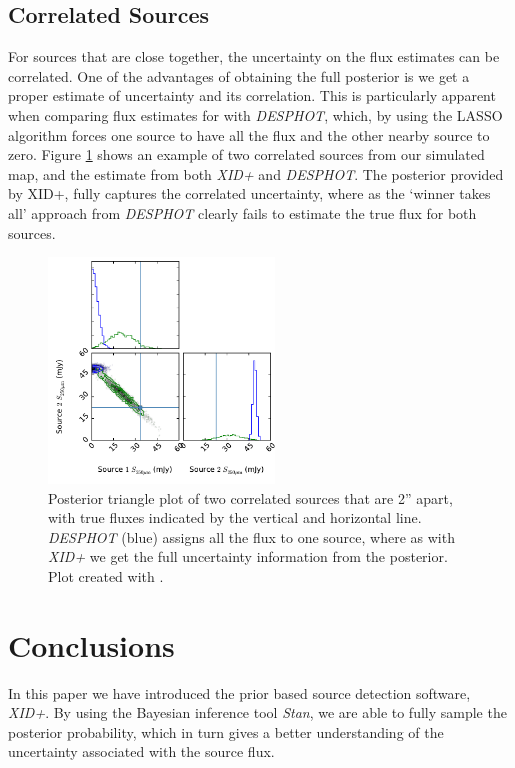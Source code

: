 \documentclass[useAMS,usenatbib]{mnras}
\begin{document}
\subsection{Correlated Sources}
For sources that are close together, the uncertainty on the flux estimates can be correlated. One of the advantages of obtaining the full posterior is we get a proper estimate of uncertainty and its correlation. This is particularly apparent when comparing flux estimates for with \emph{DESPHOT}, which, by using the LASSO algorithm forces one source to have all the flux and the other nearby source to zero. Figure \ref{fig:corr} shows an example of two correlated sources from our simulated map, and the estimate from both \emph{XID+} and \emph{DESPHOT}. The posterior provided by XID+, fully captures the correlated uncertainty, where as the `winner takes all' approach from \emph{DESPHOT} clearly fails to estimate the true flux for both sources.
 
\begin{figure} 
\includegraphics[width=6cm]{example_tri_DESHPOT_XIDp.pdf}
\caption{Posterior triangle plot of two correlated sources that are 2'' apart, with true fluxes indicated by the vertical and horizontal line. \emph{DESPHOT} (blue) assigns all the flux to one source, where as with \emph{XID+} we get the full uncertainty information from the posterior. Plot created with \protect\cite{triangle}.}\label{fig:corr}
\end{figure}

\section{Conclusions}\label{sec:conc}
In this paper we have introduced the prior based source detection software, \emph{XID+}. By using the Bayesian inference tool \emph{Stan}, we are able to fully sample the posterior probability, which in turn gives a better understanding of the uncertainty associated with the source flux. 
\end{document}

